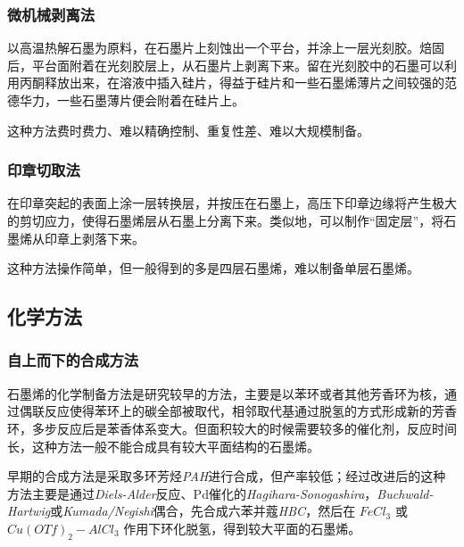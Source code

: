 \subsubsection{微机械剥离法}

以高温热解石墨为原料，在石墨片上刻蚀出一个平台，并涂上一层光刻胶。焙固后，平台面附着在光刻胶层上，从石墨片上剥离下来。留在光刻胶中的石墨可以利用丙酮释放出来，在溶液中插入硅片，得益于硅片和一些石墨烯薄片之间较强的范德华力，一些石墨薄片便会附着在硅片上。

这种方法费时费力、难以精确控制、重复性差、难以大规模制备。

\subsubsection{印章切取法}

在印章突起的表面上涂一层转换层，并按压在石墨上，高压下印章边缘将产生极大的剪切应力，使得石墨烯层从石墨上分离下来。类似地，可以制作“固定层”，将石墨烯从印章上剥落下来。

这种方法操作简单，但一般得到的多是四层石墨烯，难以制备单层石墨烯。

\subsection{化学方法}

\subsubsection{自上而下的合成方法}

石墨烯的化学制备方法是研究较早的方法，主要是以苯环或者其他芳香环为核，通过偶联反应使得苯环上的碳全部被取代，相邻取代基通过脱氢的方式形成新的芳香环，多步反应后是苯香体系变大。但面积较大的时候需要较多的催化剂，反应时间长，这种方法一般不能合成具有较大平面结构的石墨烯。

早期的合成方法是采取多环芳烃\textit{PAH}进行合成，但产率较低；经过改进后的这种方法主要是通过\textit{Diels-Alder}反应、Pd催化的\textit{Hagihara-Sonogashira}，\textit{Buchwald-Hartwig}或\textit{Kumada/Negishi}偶合，先合成六苯并蔻\textit{HBC}，然后在 $FeCl_3$ 或 $Cu(OTf)_2-AlCl_3$ 作用下环化脱氢，得到较大平面的石墨烯。\cite{RN2}


